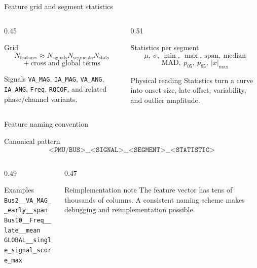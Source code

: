 ﻿\documentclass[10pt,aspectratio=169]{beamer}
\newcommand{\code}[1]{\texttt{\footnotesize #1}}
\begin{document}
\begin{frame}{Feature grid and segment statistics}
\small
\begin{columns}[T,totalwidth=\textwidth]
\begin{column}{0.45\textwidth}
\begin{block}{Grid}
\[
N_{\mathrm{features}}\approx
N_{\mathrm{signals}}N_{\mathrm{segments}}N_{\mathrm{stats}}
\]
\[
+\ \text{cross and global terms}
\]
\end{block}
\begin{exampleblock}{Signals}
\code{VA\_MAG}, \code{IA\_MAG}, \code{VA\_ANG}, \code{IA\_ANG}, \code{Freq}, \code{ROCOF}, and related phase/channel variants.
\end{exampleblock}
\end{column}
\begin{column}{0.51\textwidth}
\begin{block}{Statistics per segment}
\[
\mu,\ \sigma,\ \min,\ \max,\ \mathrm{span},\ \mathrm{median}
\]
\[
\mathrm{MAD},\ p_{05},\ p_{95},\ |x|_{\max}
\]
\end{block}
\begin{alertblock}{Physical reading}
Statistics turn a curve into onset size, late offset, variability, and outlier amplitude.
\end{alertblock}
\end{column}
\end{columns}
\end{frame}

\iffalse
\begin{frame}{Feature naming convention}
\small
\begin{block}{Canonical pattern}
\[
\texttt{<PMU/BUS>\_\_<SIGNAL>\_\_<SEGMENT>\_\_<STATISTIC>}
\]
\end{block}
\begin{columns}[T,totalwidth=\textwidth]
\begin{column}{0.49\textwidth}
\begin{exampleblock}{Examples}
\code{Bus2\_\_VA\_MAG\_\_early\_\_span}\\
\code{Bus10\_\_Freq\_\_late\_\_mean}\\
\code{GLOBAL\_\_single\_signal\_score\_max}
\end{exampleblock}
\end{column}
\begin{column}{0.47\textwidth}
\begin{alertblock}{Reimplementation note}
The feature vector has tens of thousands of columns. A consistent naming scheme makes debugging and reimplementation possible.
\end{alertblock}
\end{column}
\end{columns}
\end{frame}
\end{document}
